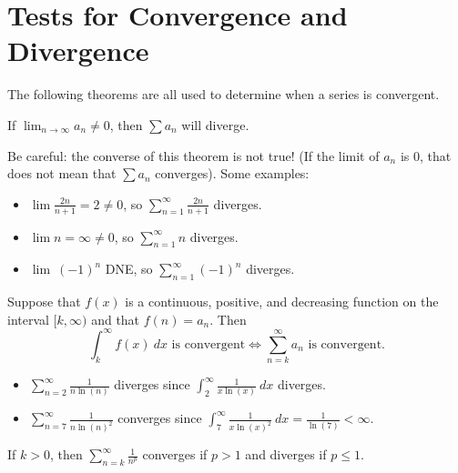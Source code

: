 \section{Tests for Convergence and Divergence}

The following theorems are all used to determine when a series is convergent.

\begin{thm} If $\displaystyle \lim_{n\to\infty}a_n\neq 0$, then $\sum a_n$ will diverge.
\end{thm}
Be careful: the converse of this theorem is not true! (If the limit of $a_n$ is 0, that does not mean that $\sum a_n$ converges).  Some examples:

\begin{itemize}
\item $\lim\frac{2n}{n+1}=2\neq 0$, so $\displaystyle\sum_{n=1}^\infty \frac{2n}{n+1}$ diverges.
\item $\lim n = \infty\neq 0$, so $\displaystyle\sum_{n=1}^\infty n$ diverges.
\item $\lim\ (-1)^n$ DNE, so $\displaystyle\sum_{n=1}^\infty (-1)^n$ diverges.

\end{itemize}


\begin{thm}
Suppose that $f(x)$ is a continuous, positive, and decreasing function on the interval $[k,\infty)$ and that $f(n)=a_n$. Then
$$\int_k^\infty f(x)\ dx\text{ is convergent} \iff \sum_{n=k}^\infty a_n\text{ is convergent}.$$
\end{thm}

\begin{itemize}
\item $\displaystyle \sum_{n=2}^\infty \frac{1}{n\ln(n)}$ diverges since $\displaystyle\int_2^\infty \frac{1}{x\ln(x)}\ dx$ diverges.
\item $\displaystyle \sum_{n=7}^\infty \frac{1}{n\ln(n)^2}$ converges since $\displaystyle\int_7^\infty \frac{1}{x\ln(x)^2}\ dx=\frac{1}{\ln(7)}<\infty$.
\end{itemize}


\begin{thm}
\phantom{}

If $k>0$, then $\displaystyle\sum_{n=k}^\infty\frac{1}{n^p}$ converges if $p>1$ and diverges if $p\leq 1$.
\end{thm}



